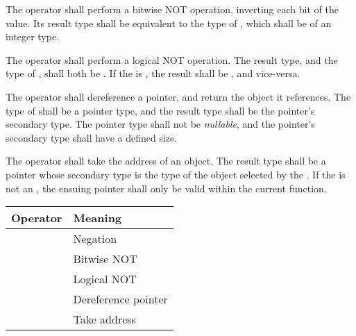 \specsubsubitem
The \terminal{\textasciitilde} operator shall perform a bitwise NOT operation,
inverting each bit of the value. Its result type shall be equivalent to the
type of , which shall be of an integer type.

\specsubsubitem
The \terminal{!} operator shall perform a logical NOT operation. The result
type, and the type of , shall both be
. If the  is , the
result shall be , and vice-versa.

\specsubsubitem
The \terminal{*} operator shall dereference a pointer, and return the object it
references.  The type of  shall be a pointer
type, and the result type shall be the pointer's secondary type. The pointer
type shall not be \textit{nullable}, and the pointer's secondary type shall have
a defined size.

\specsubsubitem
The \terminal{\&} operator shall take the address of an object. The result type
shall be a pointer whose secondary type is the type of the object selected by
the . If the  is not
an , the ensuing pointer shall only be valid within
the current function.


\begin{tabular}{r | l }
Operator & Meaning \\
\hline
\terminal{-} & Negation \\
\terminal{\textasciitilde} & Bitwise NOT \\
\terminal{!} & Logical NOT \\
\terminal{*} & Dereference pointer \\
\terminal{\&} & Take address \\
\end{tabular}


\begin{grammar}
 \\
	 \\
	 \terminal{:}  \\
	   \\
	   \\

 \\
	 \\
\end{grammar}

